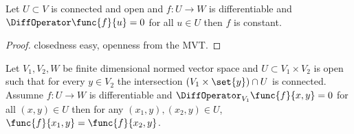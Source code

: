 \begin{corollary}
    Let \(U \subset V\) is connected and open and \(f: U \to W\) is differentiable and \(\DiffOperator \func{f}{u} = 0\) for all \(u \in U\) then \(f\) is constant.
\end{corollary}

\begin{proof}
    closedness easy, openness from the MVT.
\end{proof}

\begin{corollary}
    Let \(V_1, V_2, W\) be finite dimensional normed vector space and \(U \subset V_1 \times V_2\) is open such that for every \(y \in V_2\) the intersection \((V_1 \times \set{y}) \cap U\) is connected. Assumne \(f : U \to W\) is differentiable and \(\DiffOperator_{V_1} \func{f}{x,y} = 0\) for all \((x,y) \in U\) then for any \((x_1,y), (x_2,y) \in U\),\(\func{f}{x_1,y} = \func{f}{x_2,y}\).
\end{corollary}

